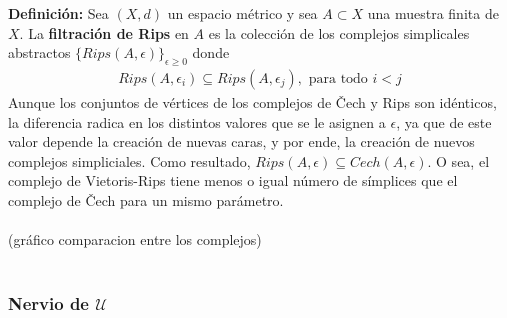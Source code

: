 \documentclass[a4paper,11pt]{article}
\begin{document}
\textbf{Definición:} Sea $(X, d)$ un espacio métrico y sea $A \subset X$ una muestra finita de $X$. La \textbf{filtración de Rips} en $A$ es la colección de los complejos simplicales abstractos $\{Rips(A,\epsilon)\}_{\epsilon \geq 0}$ donde
\begin{align*}
    Rips(A,\epsilon_{i}) \subseteq Rips(A,\epsilon_{j}), \text{ para todo } i < j
\end{align*}
Aunque los conjuntos de vértices de los complejos de Čech y Rips son idénticos, la diferencia radica en los distintos valores que se le asignen a $\epsilon$, ya que de este valor depende la creación de nuevas caras, y por ende, la creación de nuevos complejos simpliciales. Como resultado, $Rips(A,\epsilon) \subseteq Cech(A,\epsilon)$. O sea, el complejo de
Vietoris-Rips tiene menos o igual número de símplices que el complejo de Čech para un mismo parámetro.\\
\\
(gráfico comparacion entre los complejos)\\
\\


\subsubsection*{Nervio de $\mathcal{U}$}
\end{document}
